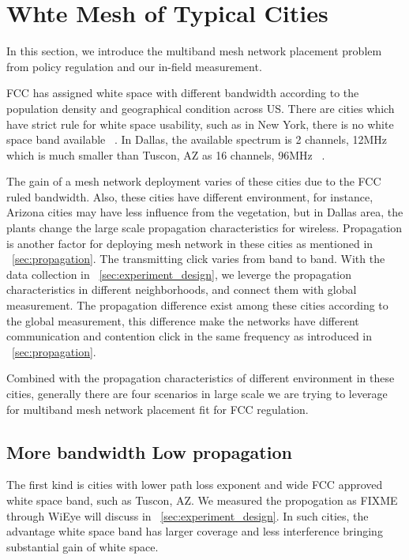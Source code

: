 \section{Whte Mesh of Typical Cities}
\label{sec:cities}

In this section, we introduce the multiband mesh network placement problem from policy regulation and our in-field measurement. 

FCC has assigned white space with different bandwidth according to the population density and geographical condition across US.
There are cities which have strict rule for white space usability, such as in New York, there is no white space band available ~\cite{googlespectrumdatabase}. 
In Dallas, the available spectrum is 2 channels, 12MHz which is much smaller than Tuscon, AZ as 16 channels, 96MHz ~\cite{googlespectrumdatabase}. 

The gain of a mesh network deployment varies of these cities due to the FCC ruled bandwidth.
Also, these cities have different environment, for instance, Arizona cities may have less influence from the vegetation, but in Dallas area, the plants change the large scale propagation characteristics for wireless.
Propagation is another factor for deploying mesh network in these cities as mentioned in ~\ref{sec:propagation}.
The transmitting click varies from band to band.
With the data collection in ~\ref{sec:experiment_design}, we leverge the propagation characteristics in different neighborhoods, and connect them with global measurement.
The propagation difference exist among these cities according to the global measurement, this difference make the networks have different communication and contention click in the same frequency as introduced in ~\ref{sec:propagation}.

Combined with the propagation characteristics of different environment in these cities, generally there are four scenarios in large scale we are trying to leverage for multiband mesh network placement fit for FCC regulation.

\subsection{More bandwidth Low propagation}
The first kind is cities with lower path loss exponent and wide FCC approved white space band, such as Tuscon, AZ. We measured the propogation as FIXME through WiEye will discuss in ~\ref{sec:experiment_design}.
In such cities, the advantage white space band has larger coverage and less interference bringing substantial gain of white space.


